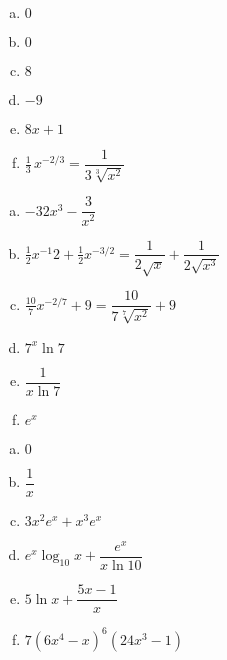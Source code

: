 \documentclass[11pt,letterpaper]{article}
\begin{document}
\begin{minipage}{0.5\textwidth}
\prob
\begin{enumerate}[(a)]
\item $0$
\item $0$
\item $8$
\item $-9$
\item $8x + 1$
\item $\frac{1}{3}\, x^{-2/3}= \dfrac{1}{3 \sqrt[3]{x^2}}$
\end{enumerate} \vfill

\prob
\begin{enumerate}[(a)]
\item $-32x^3 - \dfrac{3}{x^2}$
\item $\frac{1}{2} x^{-1}{2} + \frac{1}{2} x^{-3/2}= \dfrac{1}{2 \sqrt{x}} + \dfrac{1}{2 \sqrt{x^3}}$
\item $\frac{10}{7}x^{-2/7} + 9= \dfrac{10}{7 \sqrt[7]{x^2}} + 9$
\item $7^x \ln 7$
\item $\dfrac{1}{x \ln 7}$
\item $e^x$
\end{enumerate} \vfill

\prob
\begin{enumerate}[(a)]
\item $0$
\item $\dfrac{1}{x}$
\item $3x^2 e^x + x^3 e^x$
\item $e^x \log_{10} x + \dfrac{e^x}{x \ln 10}$
\item $5 \ln x + \dfrac{5x - 1}{x}$
\item $7(6x^4 - x)^6 (24x^3 - 1)$
\end{enumerate} \vfill
\end{minipage}
\end{document}

